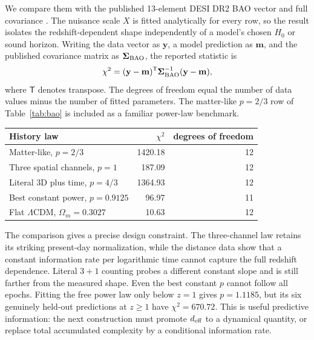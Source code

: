 \documentclass[10pt]{article}
\begin{document}
We compare them with the published 13-element DESI DR2 BAO vector and full
covariance \citep{DESI2025}.  The nuisance scale $X$ is fitted analytically for
every row, so the result isolates the redshift-dependent shape independently
of a model's chosen $H_0$ or sound horizon.
Writing the data vector as $\mathbf y$, a model prediction as $\mathbf m$, and
the published covariance matrix as $\boldsymbol\Sigma_{\rm BAO}$, the reported
statistic is
\begin{equation}
\chi^2=(\mathbf y-\mathbf m)^{\mathsf T}
\boldsymbol\Sigma_{\rm BAO}^{-1}(\mathbf y-\mathbf m),
\label{eq:chi-square}
\end{equation}
where $\mathsf T$ denotes transpose.  The degrees of freedom equal the number
of data values minus the number of fitted parameters.  The matter-like
$p=2/3$ row of Table~\ref{tab:bao} is included as a familiar power-law
benchmark.

\begin{center}
\label{tab:bao}
\begin{tabular}{lrr}
\toprule
History law & $\chi^2$ & degrees of freedom\\
\midrule
Matter-like, $p=2/3$ & 1420.18 & 12\\
Three spatial channels, $p=1$ & 187.09 & 12\\
Literal 3D plus time, $p=4/3$ & 1364.93 & 12\\
Best constant power, $p=0.9125$ & 96.97 & 11\\
Flat $\Lambda$CDM, $\Omega_m=0.3027$ & 10.63 & 12\\
\bottomrule
\end{tabular}
\end{center}

The comparison gives a precise design constraint.  The three-channel law
retains its striking present-day normalization, while the distance data show
that a constant information rate per logarithmic time cannot capture the full
redshift dependence.  Literal $3+1$ counting probes a different constant slope
and is still farther from the measured shape.  Even the best constant $p$
cannot follow all epochs.  Fitting the free power law only below $z=1$ gives
$p=1.1185$, but its six genuinely held-out predictions at $z\geq1$ have
$\chi^2=670.72$.  This is useful predictive information: the next construction
must promote $d_{\rm eff}$ to a dynamical quantity, or replace total accumulated
complexity by a conditional information rate.
\end{document}
